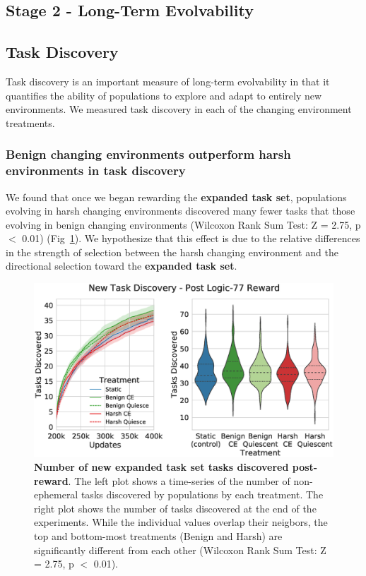 \documentclass[10pt,letterpaper,final]{article}
\begin{document}
\subsection*{Stage 2 - Long-Term Evolvability}
\subsection*{Task Discovery}
Task discovery is an important measure of long-term evolvability in that it quantifies the ability of populations to explore and adapt to entirely new environments. We measured task discovery in each of the changing environment treatments.

\subsubsection*{Benign changing environments outperform harsh environments in task discovery}
We found that once we began rewarding the \textbf{expanded task set}, populations evolving in harsh changing environments discovered many fewer tasks that those evolving in benign changing environments (Wilcoxon Rank Sum Test: Z = 2.75, p $<$ 0.01) (Fig~\ref{fig:postreward_task_discovery}). We hypothesize that this effect is due to the relative differences in the strength of selection between the harsh changing environment and the directional selection toward the \textbf{expanded task set}. 
	\begin{figure}[!h]
	\includegraphics[width=0.95\columnwidth]{figures/LTE/fig15.eps}
	\caption{\textbf{Number of new expanded task set tasks discovered post-reward}. The left plot shows a time-series of the number of non-ephemeral tasks discovered by populations by each treatment. The right plot shows the number of tasks discovered at the end of the experiments. While the individual values overlap their neigbors, the top and bottom-most treatments (Benign and Harsh) are significantly different from each other (Wilcoxon Rank Sum Test: Z = 2.75, p $<$ 0.01). %
	}
	\label{fig:postreward_task_discovery}
	\end{figure} 
\end{document}

